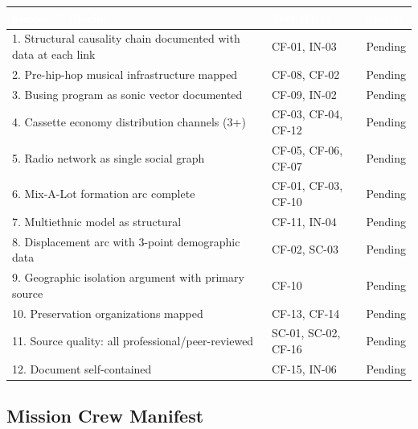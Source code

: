 \documentclass[11pt,letterpaper]{article}
\newcommand{\tableheader}[1]{\textbf{\sffamily\textcolor{white}{#1}}}
\begin{document}
\begin{center}
\begin{tabularx}{\textwidth}{XL{3.5cm}C{1.5cm}}
\toprule
{}
\tableheader{Success Criterion} & \tableheader{Test ID(s)} & \tableheader{Status} \\
. Structural causality chain documented with data at each link & CF-01, IN-03 & Pending \\
2. Pre-hip-hop musical infrastructure mapped & CF-08, CF-02 & Pending \\
3. Busing program as sonic vector documented & CF-09, IN-02 & Pending \\
4. Cassette economy distribution channels (3+) & CF-03, CF-04, CF-12 & Pending \\
5. Radio network as single social graph & CF-05, CF-06, CF-07 & Pending \\
6. Mix-A-Lot formation arc complete & CF-01, CF-03, CF-10 & Pending \\
7. Multiethnic model as structural & CF-11, IN-04 & Pending \\
8. Displacement arc with 3-point demographic data & CF-02, SC-03 & Pending \\
9. Geographic isolation argument with primary source & CF-10 & Pending \\
10. Preservation organizations mapped & CF-13, CF-14 & Pending \\
11. Source quality: all professional/peer-reviewed & SC-01, SC-02, CF-16 & Pending \\
12. Document self-contained & CF-15, IN-06 & Pending \\
\bottomrule
\end{tabularx}
\end{center}

\subsection{Mission Crew Manifest}
\end{document}
